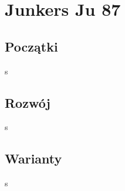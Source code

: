 \section{Junkers Ju 87}

\subsection{Początki}

s

\subsection{Rozwój}

s

\subsection{Warianty}

s




